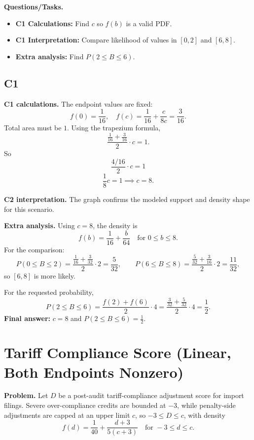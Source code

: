 \textbf{Questions/Tasks.}
\begin{itemize}
	\item \textbf{C1 Calculations:} Find $c$ so $f(b)$ is a valid PDF.
	\item \textbf{C1 Interpretation:} Compare likelihood of values in $[0,2]$ and $[6,8]$.
	\item \textbf{Extra analysis:} Find $P(2\le B\le 6)$.
\end{itemize}

\subsection*{C1}

\textbf{C1 calculations.}
The endpoint values are fixed:
\[
f(0)=\frac{1}{16},\quad f(c)=\frac{1}{16}+\frac{c}{8c}=\frac{3}{16}.
\]
Total area must be $1$. Using the trapezium formula,
\[
\frac{\frac{1}{16}+\frac{3}{16}}{2}\cdot c=1.
\]
So
\[
\frac{4/16}{2}\cdot c=1
\]
	\[
	\frac{1}{8}c=1\implies c=8.
	\]

\textbf{C2 interpretation.}
The graph confirms the modeled support and density shape for this scenario.

\textbf{Extra analysis.}
Using $c=8$, the density is
\[
f(b)=\frac{1}{16}+\frac{b}{64}\quad\text{for }0\le b\le 8.
\]
For the comparison:
\[
P(0\le B\le2)=\frac{\frac{1}{16}+\frac{3}{32}}{2}\cdot2=\frac{5}{32},\qquad
P(6\le B\le8)=\frac{\frac{5}{32}+\frac{3}{16}}{2}\cdot2=\frac{11}{32},
\]
so $[6,8]$ is more likely.

For the requested probability,
\[
P(2\le B\le6)=\frac{f(2)+f(6)}{2}\cdot4
=\frac{\frac{3}{32}+\frac{5}{32}}{2}\cdot4
=\frac12.
\]
\textbf{Final answer:} $c=8$ and $P(2\le B\le6)=\frac12$.

	\section{Tariff Compliance Score (Linear, Both Endpoints Nonzero)}
	
	\textbf{Problem.}
	Let $D$ be a post-audit tariff-compliance adjustment score for import filings. Severe over-compliance credits are bounded at $-3$, while penalty-side adjustments are capped at an upper limit $c$, so $-3\le D\le c$, with density
	\[
	f(d)=\frac{1}{40}+\frac{d+3}{5(c+3)}\quad\text{for }-3\le d\le c.
	\]
	
